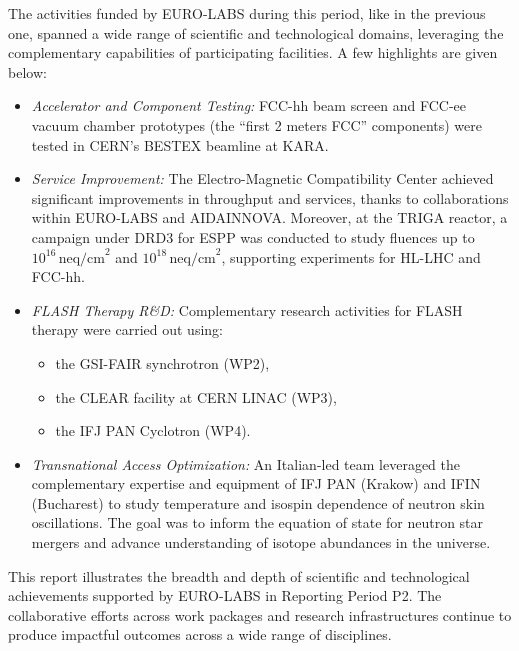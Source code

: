 The activities funded by EURO-LABS during this period, like in the previous one, spanned a wide range of scientific and technological domains, leveraging the complementary capabilities of participating facilities. A few highlights are given below: 



\begin{itemize}
    \item {\it Accelerator and Component Testing:} FCC-hh beam screen and FCC-ee vacuum chamber prototypes (the ``first 2 meters FCC'' components) were tested in CERN's BESTEX beamline at KARA.
    
    \item {\it Service Improvement:} The Electro-Magnetic Compatibility Center achieved significant improvements in throughput and services, thanks to collaborations within EURO-LABS and AIDAINNOVA. Moreover, at the TRIGA reactor, a campaign under DRD3 for ESPP  was conducted to study fluences up to \(10^{16} \, \text{neq/cm}^2\) and \(10^{18} \, \text{neq/cm}^2\), supporting experiments for HL-LHC and FCC-hh.
    
    \item {\it FLASH Therapy R\&D:} Complementary research activities for FLASH therapy were carried out using:
    \begin{itemize}
        \item the GSI-FAIR synchrotron (WP2),
        \item the CLEAR facility at CERN LINAC (WP3),
        \item the IFJ PAN Cyclotron (WP4).
    \end{itemize}
    
    \item {\it Transnational Access Optimization:} An Italian-led team leveraged the complementary expertise and equipment of IFJ PAN (Krakow) and IFIN (Bucharest) to study temperature and isospin dependence of neutron skin oscillations. The goal was to inform the equation of state for neutron star mergers and advance understanding of isotope abundances in the universe.
\end{itemize}



This report illustrates the breadth and depth of scientific and technological achievements supported by EURO-LABS in Reporting Period P2. The collaborative efforts across work packages and research infrastructures continue to produce impactful outcomes across a wide range of disciplines.


